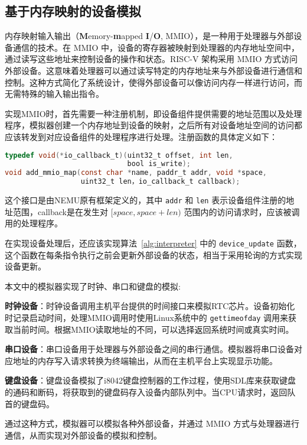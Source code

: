 \subsection{基于内存映射的设备模拟}

内存映射输入输出（\textbf{M}emory-\textbf{m}apped \textbf{I}/\textbf{O}, MMIO），是一种用于处理器与外部设备通信的技术。在 MMIO 中，设备的寄存器被映射到处理器的内存地址空间中，通过读写这些地址来控制设备的操作和状态。RISC-V 架构采用 MMIO 方式访问外部设备。这意味着处理器可以通过读写特定的内存地址来与外部设备进行通信和控制。这种方式简化了系统设计，使得外部设备可以像访问内存一样进行访问，而无需特殊的输入输出指令。

实现MMIO时，首先需要一种注册机制，即设备组件提供需要的地址范围以及处理程序，模拟器创建一个内存地址到设备的映射，之后所有对设备地址空间的访问都应该转发到对应设备组件的处理程序进行处理。注册函数的具体定义如下：

\begin{lstlisting}[language=C]
typedef void(*io_callback_t)(uint32_t offset, int len,
                             bool is_write);
void add_mmio_map(const char *name, paddr_t addr, void *space,
                  uint32_t len，io_callback_t callback);
\end{lstlisting}

这个接口是由NEMU原有框架定义的，其中 \lstinline{addr} 和 \lstinline{len} 表示设备组件注册的地址范围，callback是在发生对 $[space, space+len)$ 范围内的访问请求时，应该被调用的处理程序。

在实现设备处理后，还应该实现算法~\ref{alg:interpreter} 中的 \lstinline{device_update} 函数，这个函数在每条指令执行之前会更新外部设备的状态，相当于采用轮询的方式实现设备更新。

本文中的模拟器实现了时钟、串口和键盘的模拟:

\textbf{时钟设备}：时钟设备调用主机平台提供的时间接口来模拟RTC芯片。设备初始化时记录启动时间，处理MMIO调用时使用Linux系统中的 \lstinline{gettimeofday} 调用来获取当前时间。根据MMIO读取地址的不同，可以选择返回系统时间或真实时间。

\textbf{串口设备}：串口设备用于处理器与外部设备之间的串行通信。模拟器将串口设备对应地址的内存写入请求转换为终端输出，从而在主机平台上实现显示功能。

\textbf{键盘设备}：键盘设备模拟了i8042键盘控制器的工作过程，使用SDL库来获取键盘的通码和断码，将获取到的键盘码存入设备内部队列中。当CPU请求时，返回队首的键盘码。

通过这种方式，模拟器可以模拟各种外部设备，并通过 MMIO 方式与处理器进行通信，从而实现对外部设备的模拟和控制。

